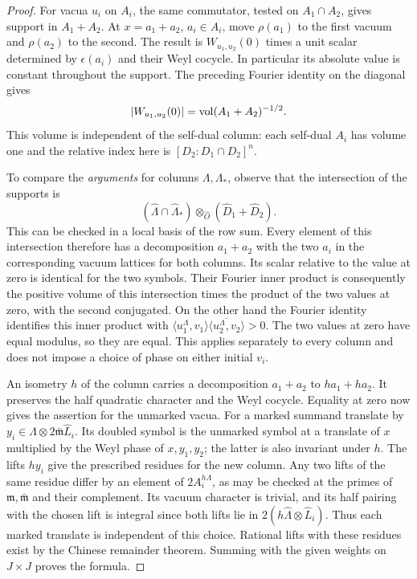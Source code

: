 \begin{proof}
For vacua \(u_i\) on \(A_i\), the same commutator, tested on
\(A_1\cap A_2\), gives support in \(A_1+A_2\). At
\(x=a_1+a_2\), \(a_i\in A_i\), move \(\rho(a_1)\) to the
first vacuum and \(\rho(a_2)\) to the second. The result is
\(W_{u_1,u_2}(0)\) times a unit scalar determined by
\(\epsilon(a_i)\) and their Weyl cocycle. In particular its
absolute value is constant throughout the support. The preceding
Fourier identity on the diagonal gives
\[
 |W_{u_1,u_2}(0)|={\rm vol}(A_1+A_2)^{-1/2}.
\]
This volume is independent of the self-dual column: each
self-dual \(A_i\) has volume one and the relative index here
is \([D_2:D_1\cap D_2]^n\).

To compare the \emph{arguments} for columns \(\Lambda,\Lambda_*\),
observe that the intersection of the supports is
\[
 (\widehat\Lambda\cap\widehat\Lambda_*)\otimes_{\widehat O}
                        (\widehat D_1+\widehat D_2).
\]
This can be checked in a local basis of the row sum. Every
element of this intersection therefore has a decomposition
\(a_1+a_2\) with the two \(a_i\) in the corresponding vacuum
lattices for both columns. Its scalar relative to the value at
zero is identical for the two symbols. Their Fourier inner
product is consequently the positive volume of this intersection
times the product of the two values at zero, with the second
conjugated. On the other hand the Fourier identity identifies
this inner product with
\(\langle u_1^\Lambda,v_1\rangle
 \overline{\langle u_2^\Lambda,v_2\rangle}>0\).
The two values at zero have equal modulus, so they are equal.
This applies separately to every column and does not impose a
choice of phase on either initial \(v_i\).

An isometry \(h\) of the column carries a decomposition
\(a_1+a_2\) to \(ha_1+ha_2\). It preserves the half quadratic
character and the Weyl cocycle. Equality at zero now gives the
assertion for the unmarked vacua. For a marked summand translate
by \(y_i\in\widehat\Lambda\otimes 2\bar{\mathfrak m}\widehat L_i\).
Its doubled symbol is the unmarked symbol at a translate of \(x\)
multiplied by the Weyl phase of \(x,y_1,y_2\); the latter is
also invariant under \(h\). The lifts \(hy_i\) give the prescribed
residues for the new column. Any two lifts of the same residue
differ by an element of \(2A_i^{h\Lambda}\), as may be checked at
the primes of \(\mathfrak m,\bar{\mathfrak m}\) and their
complement. Its vacuum character is trivial, and its half
pairing with the chosen lift is integral since both lifts lie in
\(2(h\widehat\Lambda\otimes\widehat L_i)\).
Thus each marked translate is independent of this choice.
Rational lifts with these residues exist by the Chinese remainder
theorem. Summing with the given weights on \(J\times J\) proves
the formula.
\end{proof}
